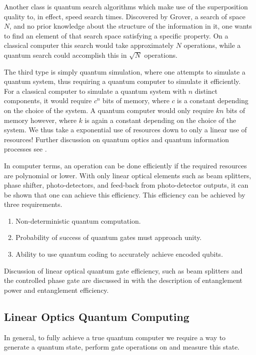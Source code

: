 \documentclass[aps,pra,twocolumn,amsmath,amssymb,nofootinbib,superscriptaddress]{revtex4}
\begin{document}
Another class is quantum search algorithms which make use of the superposition quality to, in effect, speed search times. Discovered by Grover, a search of space $N$, and no prior knowledge about the structure of the information in it, one wants to find an element of that search space satisfying a specific property. On a classical computer this search would take approximately $N$ operations, while a quantum search could accomplish this in $\sqrt{N}$ operations.

The third type is simply quantum simulation, where one attempts to simulate a quantum system, thus requiring a quantum computer to simulate it efficiently. For a classical computer to simulate a quantum system with $n$ distinct components, it would require $c^n$ bits of memory, where $c$ is a constant depending on the choice of the system. A quantum computer would only require $kn$ bits of memory however, where $k$ is again a constant depending on the choice of the system. We thus take a exponential use of resources down to only a linear use of resources! Further discussion on quantum optics and quantum information processes see \cite{walls,aharonov,diVincenzo}.


In computer terms, an operation can be done efficiently if the required resources are polynomial or lower. With only linear optical elements such as beam splitters, phase shifter, photo-detectors, and feed-back from photo-detector outputs, it can be shown that one can achieve this efficiency. This efficiency can be achieved by three requirements.
\begin{enumerate}
\item{Non-deterministic quantum computation.} 
\item{Probability of success of quantum gates must approach unity.}
\item{Ability to use quantum coding to accurately achieve encoded qubits.} 
\end{enumerate}


Discussion of linear optical quantum gate efficiency, such as beam splitters and the controlled phase gate are discussed in \cite{lemr} with the description of entanglement power and entanglement efficiency.

\subsection{Linear Optics Quantum Computing}
In general, to fully achieve a true quantum computer we require a way to generate a quantum state, perform gate operations on and measure this state.
\end{document}
